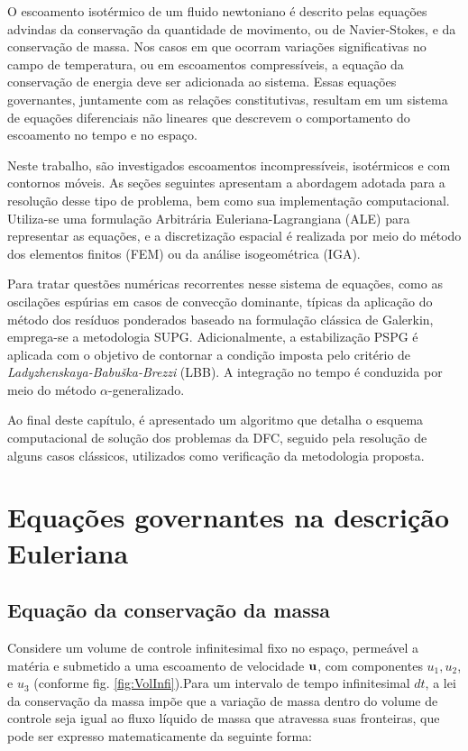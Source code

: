 \documentclass[tese_patricia]{subfiles}%
\begin{document}
O escoamento isotérmico de um fluido newtoniano é descrito pelas equações advindas da conservação da quantidade de movimento, ou de Navier-Stokes, e da conservação de massa. Nos casos em que ocorram variações significativas no campo de temperatura, ou em escoamentos compressíveis, a equação da conservação de energia deve ser adicionada ao sistema. Essas equações governantes, juntamente com as relações constitutivas, resultam em um sistema de equações diferenciais não lineares que descrevem o comportamento do escoamento no tempo e no espaço. 

Neste trabalho, são investigados escoamentos incompressíveis, isotérmicos e com contornos móveis. As seções seguintes apresentam a abordagem adotada para a resolução desse tipo de problema, bem como sua implementação computacional. Utiliza-se uma formulação Arbitrária Euleriana-Lagrangiana (ALE) para representar as equações, e a discretização espacial é realizada por meio do método dos elementos finitos (FEM) ou da análise isogeométrica (IGA).

Para tratar questões numéricas recorrentes nesse sistema de equações, como as oscilações espúrias em casos de convecção dominante, típicas da aplicação do método dos resíduos ponderados baseado na formulação clássica de Galerkin, emprega-se a metodologia SUPG. Adicionalmente, a estabilização PSPG é aplicada com o objetivo de contornar a condição imposta pelo critério de \textit{Ladyzhenskaya-Babuška-Brezzi} (LBB). A integração no tempo é conduzida por meio do método $\alpha$-generalizado.

Ao final deste capítulo, é apresentado um algoritmo que detalha o esquema computacional de solução dos problemas da DFC, seguido pela resolução de alguns casos clássicos, utilizados como verificação da metodologia proposta.


\section{Equações governantes na descrição Euleriana} 


\subsection{Equação da conservação da massa}


Considere um volume de controle infinitesimal fixo no espaço, permeável a matéria e submetido a uma escoamento de velocidade $\mathbf{u}$, com componentes $u_1, u_2$, e $u_3$ (conforme fig. \ref{fig:VolInfi}).Para um intervalo de tempo infinitesimal $dt$, a lei da conservação da massa impõe que a variação de massa dentro do volume de controle seja igual ao fluxo líquido de massa que atravessa suas fronteiras, que pode ser expresso matematicamente da seguinte forma:
\end{document}
